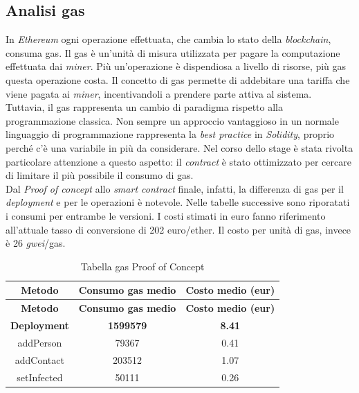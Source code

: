 \mbox{\newline}

\subsection{Analisi gas}
\label{sec:gas}
In \textit{Ethereum} ogni operazione effettuata, che cambia lo stato della \textit{blockchain}, consuma gas. Il gas è un’unità di misura utilizzata per pagare la computazione effettuata dai \textit{miner}. Più un'operazione è dispendiosa a livello di risorse, più gas questa operazione costa.
Il concetto di gas permette di addebitare una tariffa che viene pagata ai \textit{miner}, incentivandoli a prendere parte attiva al sistema.\\
Tuttavia, il gas rappresenta un cambio di paradigma rispetto alla programmazione classica. Non sempre un approccio vantaggioso in un normale linguaggio di programmazione rappresenta la \textit{best practice} in \textit{Solidity}, proprio perché c’è una variabile in più da considerare. 
Nel corso dello stage è stata rivolta particolare attenzione a questo aspetto: il \textit{contract} è stato ottimizzato per cercare di limitare il più possibile il consumo di gas.\\

Dal \textit{Proof of concept} allo \textit{smart contract} finale, infatti, la differenza di gas per il \textit{deployment} e per le operazioni è notevole. Nelle tabelle successive sono riporatati i consumi per entrambe le versioni. I costi stimati in euro fanno riferimento all'attuale tasso di conversione di 202 euro/ether. Il costo per unità di gas, invece è 26 \emph{\gls{gwei}}\glsfirstoccur/gas.
\newpage
\begin{center}
	\begin{longtable}{| c | c | c |}
		\caption{Tabella gas Proof of Concept}
		\label{tab:gas-poc}\\
		\hline
		\textbf{Metodo} & \textbf{Consumo gas medio} & \textbf{Costo medio (eur)}\\
		\endfirsthead
		\hline
		\textbf{Metodo} & \textbf{Consumo gas medio} & \textbf{Costo medio (eur)}\\
		\endhead
		\textbf{Deployment} & \textbf{1599579} & \textbf{8.41}\\
		\hline
		\endfoot
		
		\hline
		addPerson & 79367 & 0.41\\
		\hline
		addContact & 203512 & 1.07\\
		\hline
		setInfected & 50111 & 0.26\\
		\hline
	\end{longtable}
\end{center}

